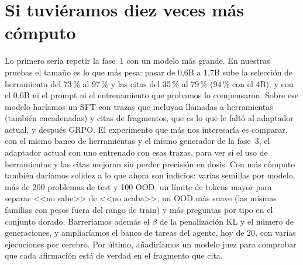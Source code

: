 \section{Si tuviéramos diez veces más cómputo}
Lo primero sería repetir la fase~1 con un modelo más grande. En nuestras pruebas el tamaño es lo que más pesa: pasar de 0,6B a 1,7B sube la selección de herramienta del 73\,\% al 97\,\% y las citas del 35\,\% al 79\,\% (94\,\% con el 4B), y con el 0,6B ni el prompt ni el entrenamiento que probamos lo compensaron. Sobre ese modelo haríamos un SFT con trazas que incluyan llamadas a herramientas (también encadenadas) y citas de fragmentos, que es lo que le faltó al adaptador actual, y después GRPO. El experimento que más nos interesaría es comparar, con el mismo banco de herramientas y el mismo generador de la fase~3, el adaptador actual con uno entrenado con esas trazas, para ver si el uso de herramientas y las citas mejoran sin perder precisión en dosis. Con más cómputo también daríamos solidez a lo que ahora son indicios: varias semillas por modelo, más de 200 problemas de test y 100 OOD, un límite de tokens mayor para separar <<no sabe>> de <<no acaba>>, un OOD más suave (las mismas familias con pesos fuera del rango de train) y más preguntas por tipo en el conjunto dorado. Barreríamos además el $\beta$ de la penalización KL y el número de generaciones, y ampliaríamos el banco de tareas del agente, hoy de 20, con varias ejecuciones por cerebro. Por último, añadiríamos un modelo juez para comprobar que cada afirmación está de verdad en el fragmento que cita.
